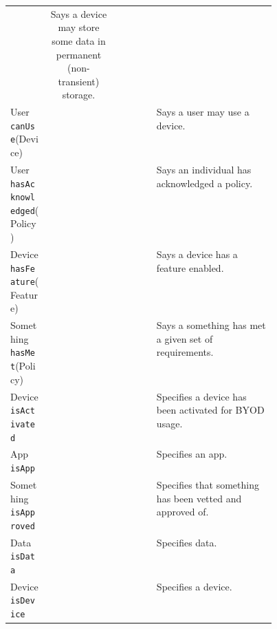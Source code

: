 \documentclass{easychair}
\newcommand{\cmark}{\ding{51}}%
\begin{document}
\begin{table}
\begin{tabular}{l c c c c c p{0.45\linewidth} }
    & Says a device may store some data in permanent (non-transient) storage.              \\
    User \texttt{canUse}(Device)                &                        &                         &                     & \cmark            & \cmark
    & Says a user may use a device.                                                        \\
    User \texttt{hasAcknowledged}(Policy)       & \cmark                 & \cmark                  & \cmark              & \cmark            & \cmark
    & Says an individual has acknowledged a policy.                                        \\
    Device \texttt{hasFeature}(Feature)         &                        & \cmark                  &                     & \cmark            &
    & Says a device has a feature enabled.                                                 \\
    Something \texttt{hasMet}(Policy)           &                        & \cmark                  &                     & \cmark            & \cmark
    & Says a something has met a given set of requirements.                                \\
    Device \texttt{isActivated}                 &                        &                         & \cmark              & \cmark            & \cmark
    & Specifies a device has been activated for BYOD usage.                                \\
    App \texttt{isApp}                          & \cmark                 &                         & \cmark              & \cmark            & \cmark
    & Specifies an app.                                                                    \\
    Something \texttt{isApproved}               &                        &                         & \cmark              &                   & \cmark
    & Specifies that something has been vetted and approved of.                            \\
    Data \texttt{isData}                        & \cmark                 &                         &                     &                   & \cmark
    & Specifies data.                                                                      \\
    Device \texttt{isDevice}                    & \cmark                 & \cmark                  & \cmark              & \cmark            & \cmark
    & Specifies a device.                                                                  \\

\end{tabular}
\end{table}
\end{document}
